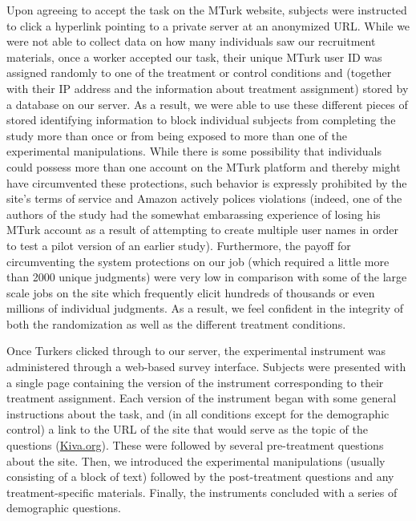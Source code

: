 \documentclass{cscw2010}
\begin{document}
Upon agreeing to accept the task on the MTurk website, subjects were
instructed to click a hyperlink pointing to a private server at an
anonymized URL. While we were not able to collect data on how many
individuals saw our recruitment materials, once a worker accepted our
task, their unique MTurk user ID was assigned randomly
to one of the treatment or control conditions and (together with their
IP address and the information about treatment assignment) stored by a
database on our server. As a result, we were able to use these
different pieces of stored identifying information to block individual
subjects from completing the study more than once or from being
exposed to more than one of the experimental manipulations. While
there is some possibility that individuals could possess more than one
account on the MTurk platform and thereby might have circumvented
these protections, such behavior is expressly prohibited by the site's
terms of service and Amazon actively polices violations (indeed, one
of the authors of the study had the somewhat embarassing experience of
losing his MTurk account as a result of attempting to create multiple
user names in order to test a pilot version of an earlier
study). Furthermore, the payoff for circumventing the system
protections on our job (which required a little more than 2000 unique
judgments) were very low in comparison with some of the large scale
jobs on the site which frequently elicit hundreds of thousands or even
millions of individual judgments. As a result, we feel confident in
the integrity of both the randomization as well as the different
treatment conditions.

Once Turkers clicked through to our server, the experimental
instrument was administered through a web-based survey
interface. Subjects were presented with a single page containing the
version of the instrument corresponding to their treatment assignment. 
Each version of the instrument began with some
general instructions about the task, and (in all conditions except for
the demographic control) a link to the URL of the site that would
serve as the topic of the questions
(\href{http://www.kiva.org}{Kiva.org}). These were followed by several
pre-treatment questions about the site. Then, we introduced the
experimental manipulations (usually consisting of a block of text)
followed by the post-treatment questions and any treatment-specific
materials. Finally, the instruments concluded with a series of
demographic questions.
\end{document}
